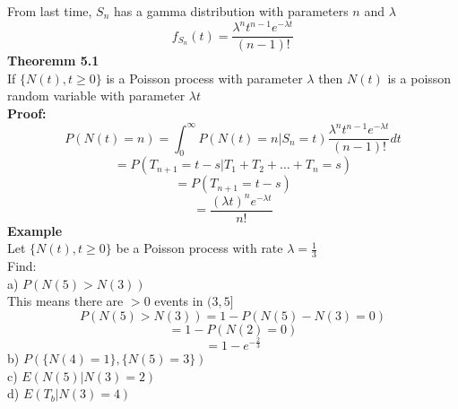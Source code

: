 \documentclass{article}
\begin{document}
From last time, $S_n$ has a gamma distribution with parameters $n$ and $\lambda$\\
$$ f_{S_n}(t) = \frac{\lambda^n t^{n-1} e^{-\lambda t}}{(n-1)!}$$
\textbf{Theoremm 5.1}\\
If $\{N(t), t \geq 0\}$ is a Poisson process with parameter $\lambda$ then $N(t)$ is a poisson random variable with parameter $\lambda t$\\
\textbf{Proof:}\\
$$P(N(t) = n) =  \int_0^{\infty} P(N(t) = n | S_n = t) \frac{\lambda^n t^{n-1} e^{-\lambda t}}{(n-1)!} dt$$
$$ = P(T_{n+1} = t-s | T_1 + T_2 + \dots + T_n = s) $$
$$ = P(T_{n+1} = t-s) $$
$$ = \frac{(\lambda t)^n e^{-\lambda t}}{n!}$$
\textbf{Example}\\
Let $\{ N(t), t \geq 0\}$ be a Poisson process with rate $\lambda = \frac{1}{3}$\\
Find:\\
a) $P(N(5) > N(3))$\\
This means there are $> 0$ events in $(3,5]$\\
$$P(N(5) > N(3)) = 1 - P(N(5) - N(3) = 0)$$
$$ = 1 - P(N(2) = 0)$$
$$ = 1 - e^{-\frac{2}{3}}$$
b) $P(\{N(4) = 1\}, \{N(5) = 3\})$\\

c) $E(N(5) | N(3) = 2)$\\
d) $E(T_b | N(3) = 4)$\\
\end{document}

